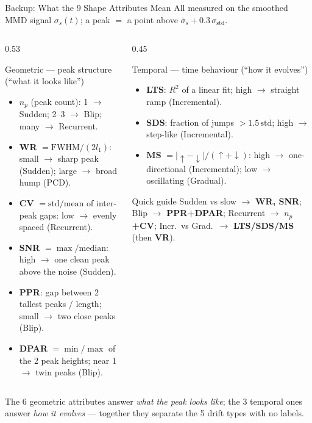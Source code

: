 \documentclass[aspectratio=169,10pt]{beamer}
\begin{document}
\begin{frame}{Backup: What the 9 Shape Attributes Mean}
	\footnotesize All measured on the smoothed MMD signal $\sigma_s(t)$; a peak $=$ a point above $\bar\sigma_s + 0.3\,\sigma_{\mathrm{std}}$.
	\vspace{0.3em}
	\begin{columns}[T]
		\begin{column}{0.53\textwidth}
			\begin{block}{\small Geometric --- peak structure (``what it looks like'')}
				\scriptsize
				\begin{itemize}
					\item \textbf{$n_p$} (peak count): 1 $\to$ Sudden; 2--3 $\to$ Blip; many $\to$ Recurrent.
					\item \textbf{WR} $=\mathrm{FWHM}/(2l_1)$: small $\to$ sharp peak (Sudden); large $\to$ broad hump (PCD).
					\item \textbf{CV} $=\mathrm{std}/\mathrm{mean}$ of inter-peak gaps: low $\to$ evenly spaced (Recurrent).
					\item \textbf{SNR} $=\max/\mathrm{median}$: high $\to$ one clean peak above the noise (Sudden).
					\item \textbf{PPR}: gap between 2 tallest peaks $/$ length; small $\to$ two close peaks (Blip).
					\item \textbf{DPAR} $=\min/\max$ of the 2 peak heights; near 1 $\to$ twin peaks (Blip).
				\end{itemize}
			\end{block}
		\end{column}
		\begin{column}{0.45\textwidth}
			\begin{block}{\small Temporal --- time behaviour (``how it evolves'')}
				\scriptsize
				\begin{itemize}
					\item \textbf{LTS}: $R^2$ of a linear fit; high $\to$ straight ramp (Incremental).
					\item \textbf{SDS}: fraction of jumps $>1.5\,\mathrm{std}$; high $\to$ step-like (Incremental).
					\item \textbf{MS} $=|{\uparrow}-{\downarrow}|/({\uparrow}+{\downarrow})$: high $\to$ one-directional (Incremental); low $\to$ oscillating (Gradual).
				\end{itemize}
			\end{block}
			\begin{exampleblock}{\small Quick guide}
				\scriptsize
				Sudden vs slow $\to$ \textbf{WR, SNR}; Blip $\to$ \textbf{PPR+DPAR}; Recurrent $\to$ \textbf{$n_p$+CV}; Incr.\ vs Grad.\ $\to$ \textbf{LTS/SDS/MS} (then \textbf{VR}).
			\end{exampleblock}
		\end{column}
	\end{columns}
	\vspace{0.2em}
	{\scriptsize The 6 geometric attributes answer \emph{what the peak looks like}; the 3 temporal ones answer \emph{how it evolves} --- together they separate the 5 drift types with no labels.}
\end{frame}
\end{document}
